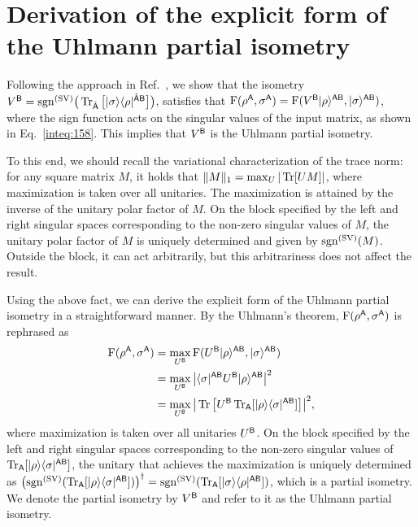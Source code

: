 








\section{Derivation of the explicit form of the Uhlmann partial isometry}
\label{sec:analyze partial iso}


Following the approach in Ref.~\cite{Jozsa1994FidelityforMixedQuantumStates}, we show that the isometry $V^{\mathsf{B}} = \mathrm{sgn}^{(\rm SV)}\big(\operatorname{Tr}_{\hat{{\mathsf{A}}}}\big[|\sigma\rangle\langle\rho|^{\hat{{\mathsf{A}}}{\mathsf{B}}}\big]\big)$, satisfies that ${\mathrm{F}}(\rho^{\mathsf{A}}, \sigma^{\mathsf{A}}) = {\mathrm{F}}(V^{\mathsf{B}}|\rho\rangle^{{\mathsf{A}}{\mathsf{B}}}, |\sigma\rangle^{{\mathsf{A}}{\mathsf{B}}})$, where the sign function acts on the singular values of the input matrix, as shown in Eq.~\eqref{inteq:158}.
This implies that $V^{\mathsf{B}}$ is the Uhlmann partial isometry.

To this end, we should recall the variational characterization of the trace norm: for any square matrix $M$, it holds that $\|M\|_1 = \max_{U}|\operatorname{Tr}[UM]|$, where maximization is taken over all unitaries. The maximization is attained by the inverse of the unitary polar factor of $M$.
On the block specified by the left and right singular spaces corresponding to the non-zero singular values of $M$, the unitary polar factor of $M$ is uniquely determined and given by $\mathrm{sgn}^{(\rm SV)}(M)$. Outside the block, it can act arbitrarily, but this arbitrariness does not affect the result.


Using the above fact, we can derive the explicit form of the Uhlmann partial isometry in a straightforward manner.
By the Uhlmann's theorem, ${\mathrm{F}}(\rho^{\mathsf{A}}, \sigma^{\mathsf{A}})$ is rephrased as
\begin{align}
    {\mathrm{F}}(\rho^{\mathsf{A}}, \sigma^{\mathsf{A}}) 
    &= \max_{U^{\mathsf{B}}}{\mathrm{F}}(U^{\mathsf{B}}|\rho\rangle^{{\mathsf{A}}{\mathsf{B}}}, |\sigma\rangle^{{\mathsf{A}}{\mathsf{B}}}) \\
    &= \max_{U^{\mathsf{B}}} \big|\langle\sigma|^{{\mathsf{A}}{\mathsf{B}}}U^{\mathsf{B}}|\rho\rangle^{{\mathsf{A}}{\mathsf{B}}}\big|^2 \\
    &= \max_{U^{\mathsf{B}}} \big|\operatorname{Tr}\big[U^{\mathsf{B}}\operatorname{Tr}_{\mathsf{A}}[|\rho\rangle\langle\sigma|^{{\mathsf{A}}{\mathsf{B}}}]\big]\big|^2,
\end{align}
where maximization is taken over all unitaries $U^{\mathsf{B}}$.
On the block specified by the left and right singular spaces corresponding to the non-zero singular values of $\operatorname{Tr}_{\mathsf{A}}[|\rho\rangle\langle\sigma|^{{\mathsf{A}}{\mathsf{B}}}]$, the unitary that achieves the maximization is uniquely determined as $\big(\mathrm{sgn}^{(\rm SV)}(\operatorname{Tr}_{\mathsf{A}}[|\rho\rangle\langle\sigma|^{{\mathsf{A}}{\mathsf{B}}}])\big)^\dag = \mathrm{sgn}^{(\rm SV)}(\operatorname{Tr}_{\mathsf{A}}[|\sigma\rangle\langle\rho|^{{\mathsf{A}}{\mathsf{B}}}])$, which is a partial isometry. We denote the partial isometry by $V^{\mathsf{B}}$ and refer to it as the Uhlmann partial isometry.


